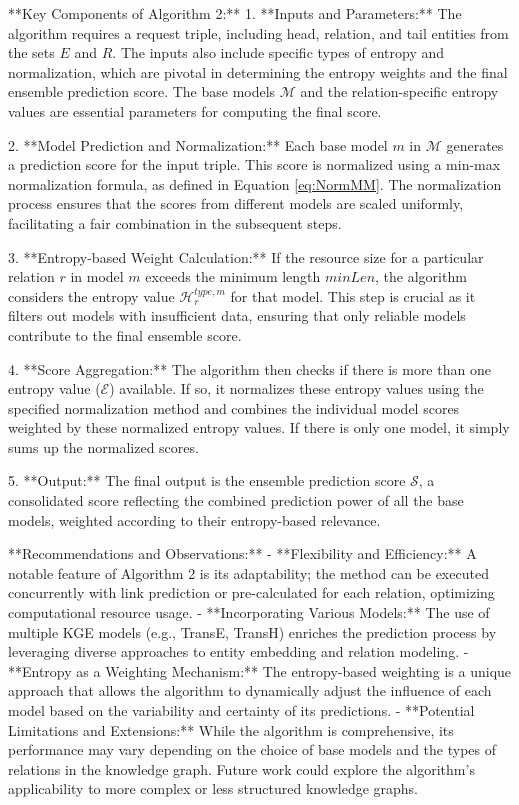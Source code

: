 \documentclass{article}
\begin{document}
**Key Components of Algorithm 2:**
1. **Inputs and Parameters:** The algorithm requires a request triple, including head, relation, and tail entities from the sets \( E \) and \( R \). The inputs also include specific types of entropy and normalization, which are pivotal in determining the entropy weights and the final ensemble prediction score. The base models \( \mathcal{M} \) and the relation-specific entropy values are essential parameters for computing the final score.

2. **Model Prediction and Normalization:** Each base model \( m \) in \( \mathcal{M} \) generates a prediction score for the input triple. This score is normalized using a min-max normalization formula, as defined in Equation \ref{eq:NormMM}. The normalization process ensures that the scores from different models are scaled uniformly, facilitating a fair combination in the subsequent steps.

3. **Entropy-based Weight Calculation:** If the resource size for a particular relation \( r \) in model \( m \) exceeds the minimum length \( minLen \), the algorithm considers the entropy value \( \mathcal{H}_r^{type,m} \) for that model. This step is crucial as it filters out models with insufficient data, ensuring that only reliable models contribute to the final ensemble score.

4. **Score Aggregation:** The algorithm then checks if there is more than one entropy value (\( \mathcal{E} \)) available. If so, it normalizes these entropy values using the specified normalization method and combines the individual model scores weighted by these normalized entropy values. If there is only one model, it simply sums up the normalized scores.

5. **Output:** The final output is the ensemble prediction score \( \mathcal{S} \), a consolidated score reflecting the combined prediction power of all the base models, weighted according to their entropy-based relevance.

**Recommendations and Observations:**
- **Flexibility and Efficiency:** A notable feature of Algorithm 2 is its adaptability; the method can be executed concurrently with link prediction or pre-calculated for each relation, optimizing computational resource usage.
- **Incorporating Various Models:** The use of multiple KGE models (e.g., TransE, TransH) enriches the prediction process by leveraging diverse approaches to entity embedding and relation modeling.
- **Entropy as a Weighting Mechanism:** The entropy-based weighting is a unique approach that allows the algorithm to dynamically adjust the influence of each model based on the variability and certainty of its predictions.
- **Potential Limitations and Extensions:** While the algorithm is comprehensive, its performance may vary depending on the choice of base models and the types of relations in the knowledge graph. Future work could explore the algorithm's applicability to more complex or less structured knowledge graphs.
\end{document}
